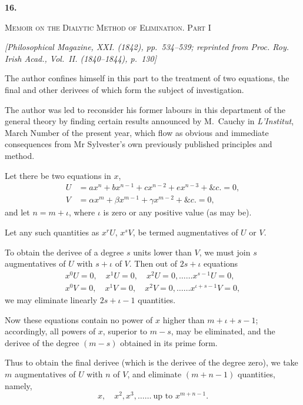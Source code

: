 \documentclass[11pt]{article}
\newcommand{\paperhead}[3]{%
  \clearpage
  \begin{center}
  {\Large\bfseries #1.}\par\vspace{0.85em}
  {\large\scshape #2}\par\vspace{0.6em}
  {\itshape [#3]}\par
  \end{center}\vspace{0.4em}}
\newcommand{\sourcepage}[1]{\marginpar{\scriptsize p.~#1}}
\begin{document}
\paperhead{16}{Memoir on the Dialytic Method of Elimination. Part I}{Philosophical Magazine, XXI. (1842), pp.~534--539; reprinted from Proc. Roy. Irish Acad., Vol.~II. (1840--1844), p.~130}

\sourcepage{86}
The author confines himself in this part to the treatment of two equations, the final and other derivees of which form the subject of investigation.

The author was led to reconsider his former labours in this department of the general theory by finding certain results announced by M.~Cauchy in \emph{L'Institut}, March Number of the present year, which flow as obvious and immediate consequences from Mr Sylvester's own previously published principles and method.

Let there be two equations in $x$,
\[
\begin{aligned}
 U&=ax^n+bx^{n-1}+cx^{n-2}+ex^{n-3}+\&c.=0,\\
 V&=\alpha x^m+\beta x^{m-1}+\gamma x^{m-2}+\&c.=0,
\end{aligned}
\]
and let $n=m+\iota$, where $\iota$ is zero or any positive value (as may be).

Let any such quantities as $x^rU$, $x^sV$, be termed augmentatives of $U$ or $V$.

To obtain the derivee of a degree $s$ units lower than $V$, we must join $s$ augmentatives of $U$ with $s+\iota$ of $V$. Then out of $2s+\iota$ equations
\[
\begin{gathered}
 x^0U=0,\quad x^1U=0,\quad x^2U=0,\ldots\ldots x^{s-1}U=0,\\
 x^0V=0,\quad x^1V=0,\quad x^2V=0,\ldots\ldots x^{\iota+s-1}V=0,
\end{gathered}
\]
we may eliminate linearly $2s+\iota-1$ quantities.

Now these equations contain no power of $x$ higher than $m+\iota+s-1$; accordingly, all powers of $x$, superior to $m-s$, may be eliminated, and the derivee of the degree $(m-s)$ obtained in its prime form.

Thus to obtain the final derivee (which is the derivee of the degree zero), we take $m$ augmentatives of $U$ with $n$ of $V$, and eliminate $(m+n-1)$ quantities, namely,
\[
 x,\quad x^2,x^3,\ldots\ldots\ \text{up to }x^{m+n-1}.
\]
\end{document}
